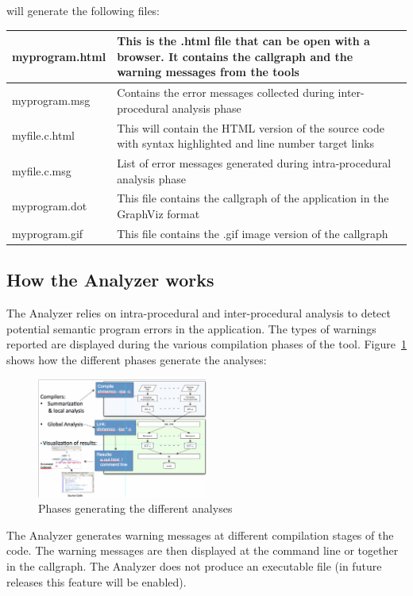 will generate the following files:

\vspace{0.1in}

\begin{center}
  \begin{tabular}{| l | p{10cm} |}
    \hline
    myprogram.html & This is the .html file that can be open with a browser. It contains the callgraph and the warning messages from the tools \\
    \hline
    myprogram.msg & Contains the error messages collected during inter-procedural analysis phase \\
    \hline
    myfile.c.html & This will contain the HTML version of the source code with syntax highlighted and line number target links \\
    \hline
    myfile.c.msg & List of error messages generated during intra-procedural analysis phase \\
    \hline
    myprogram.dot & This file contains the callgraph of the application in the GraphViz format \\
    \hline
    myprogram.gif & This file contains the .gif image version of the callgraph \\
    \hline
  \end{tabular}
\end{center}

\subsection{How the \openshmem Analyzer works}

The \openshmem Analyzer relies on intra-procedural and inter-procedural
analysis to detect potential semantic program errors in the
application. The types of warnings reported are displayed during the
various compilation phases of the tool. Figure~\ref{fig:phases} shows
how the different phases generate the analyses:

\begin{figure}[!ht]
  \begin{center}
    \includegraphics[width=0.5\textwidth]{./image002}
    \caption{Phases generating the different analyses}
    \label{fig:phases}
  \end{center}
\end{figure}

The \openshmem Analyzer generates warning messages at different
compilation stages of the code. The warning messages are then
displayed at the command line or together in the callgraph.  The
\openshmem Analyzer does not produce an executable file (in future
releases this feature will be enabled).
